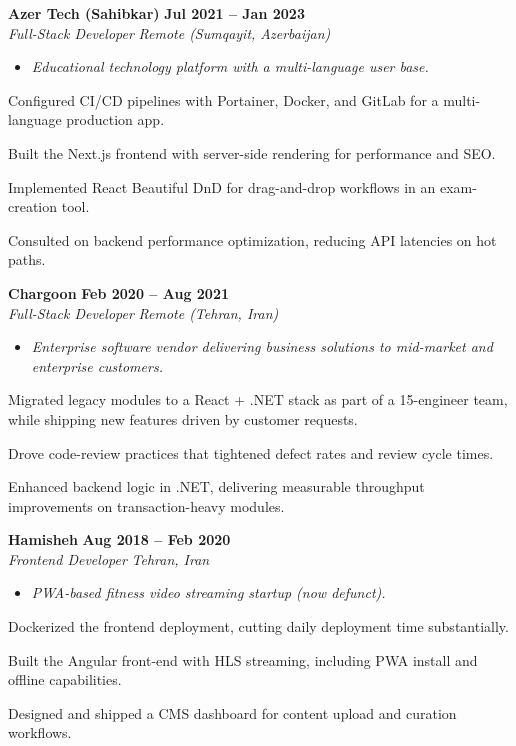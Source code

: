 \documentclass[letterpaper,10pt]{article}
\newcommand{\heading}[2]{
  \hspace{10pt}#1\hfill#2\\
}
\newcommand{\headingBf}[2]{
  \heading{\textbf{#1}}{\textbf{#2}}
}
\newcommand{\headingIt}[2]{
  \heading{\textit{#1}}{\textit{#2}}
}
\newenvironment{resume_list}{
  \vspace{-7pt}
  \begin{itemize}[itemsep=-2px, parsep=1pt, leftmargin=30pt]
}{
  \end{itemize}
  \vspace{2pt}
}
\newcommand{\companyDescription}[1]{
  \vspace{-7pt}
  \begin{itemize}[itemsep=-2px, parsep=1pt, leftmargin=12pt]
    \item[] {\color{textMuted}\textit{#1}}
  \end{itemize}
  \vspace{-4pt}
}
\begin{document}
  \headingBf{ Azer Tech (Sahibkar) }{ Jul 2021 -- Jan 2023 }
  \headingIt{ Full-Stack Developer }{ Remote (Sumqayit, Azerbaijan) }
  \companyDescription{ Educational technology platform with a multi-language user base. }
  \begin{resume_list}
    \item Configured CI/CD pipelines with Portainer, Docker, and GitLab for a multi-language production app.
    \item Built the Next.js frontend with server-side rendering for performance and SEO.
    \item Implemented React Beautiful DnD for drag-and-drop workflows in an exam-creation tool.
    \item Consulted on backend performance optimization, reducing API latencies on hot paths.
  \end{resume_list}

  \headingBf{ Chargoon }{ Feb 2020 -- Aug 2021 }
  \headingIt{ Full-Stack Developer }{ Remote (Tehran, Iran) }
  \companyDescription{ Enterprise software vendor delivering business solutions to mid-market and enterprise customers. }
  \begin{resume_list}
    \item Migrated legacy modules to a React + .NET stack as part of a 15-engineer team, while shipping new features driven by customer requests.
    \item Drove code-review practices that tightened defect rates and review cycle times.
    \item Enhanced backend logic in .NET, delivering measurable throughput improvements on transaction-heavy modules.
  \end{resume_list}

  \headingBf{ Hamisheh }{ Aug 2018 -- Feb 2020 }
  \headingIt{ Frontend Developer }{ Tehran, Iran }
  \companyDescription{ PWA-based fitness video streaming startup (now defunct). }
  \begin{resume_list}
    \item Dockerized the frontend deployment, cutting daily deployment time substantially.
    \item Built the Angular front-end with HLS streaming, including PWA install and offline capabilities.
    \item Designed and shipped a CMS dashboard for content upload and curation workflows.
  \end{resume_list}
\end{document}
